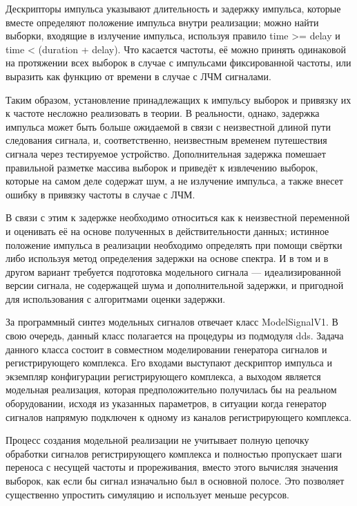 \documentclass{report}
\begin{document}
Дескрипторы импульса указывают длительность и задержку импульса, которые вместе определяют положение импульса внутри реализации; можно найти выборки, входящие в излучение импульса, используя правило time >= delay и time < (duration + delay). Что касается частоты, её можно принять одинаковой на протяжении всех выборок в случае с импульсами фиксированной частоты, или выразить как функцию от времени в случае с ЛЧМ сигналами.

Таким образом, установление принадлежащих к импульсу выборок и привязку их к частоте несложно реализовать в теории. В реальности, однако, задержка импульса может быть больше ожидаемой в связи с неизвестной длиной пути следования сигнала, и, соответственно, неизвестным временем путешествия сигнала через тестируемое устройство. Дополнительная задержка помешает правильной разметке массива выборок и приведёт к извлечению выборок, которые на самом деле содержат шум, а не излучение импульса, а также внесет ошибку в привязку частоты в случае с ЛЧМ.

В связи с этим к задержке необходимо относиться как к неизвестной переменной и оценивать её на основе полученных в действительности данных; истинное положение импульса в реализации необходимо определять при помощи свёртки либо используя метод определения задержки на основе спектра. И в том и в другом вариант требуется подготовка модельного сигнала --- идеализированной версии сигнала, не содержащей шума и дополнительной задержки, и пригодной для использования с алгоритмами оценки задержки.

За программный синтез модельных сигналов отвечает класс ModelSignalV1. В свою очередь, данный класс полагается на процедуры из подмодуля dds. Задача данного класса состоит в совместном моделировании генератора сигналов и регистрирующего комплекса. Его входами выступают дескриптор импульса и экземпляр конфигурации регистрирующего комплекса, а выходом является модельная реализация, которая предположительно получилась бы на реальном оборудовании, исходя из указанных параметров, в ситуации когда генератор сигналов напрямую подключен к одному из каналов регистрирующего комплекса.

Процесс создания модельной реализации не учитывает полную цепочку обработки сигналов регистрирующего комплекса и полностью пропускает шаги переноса с несущей частоты и прореживания, вместо этого вычисляя значения выборок, как если бы сигнал изначально был в основной полосе. Это позволяет существенно упростить симуляцию и использует меньше ресурсов.
\end{document}
